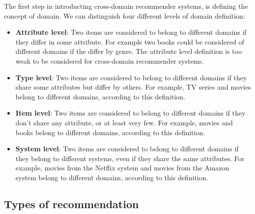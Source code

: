 The first step in introducting cross-domain recommender systems, is defining the concept of domain. We can distinguish four different levels of domain definition:
\begin{itemize}
\item \textbf{Attribute level}: Two items are considered to belong to different domains if they differ in some attribute. For example two books could be considered of different domains if the differ by genre. The attribute level definition is too weak to be considered for cross-domain recommender systems.
\item \textbf{Type level}: Two items are considered to belong to different domains if they share some attributes but differ by others. For example, TV series and movies belong to different domains, according to this definition.
\item \textbf{Item level}: Two items are considered to belong to different domains if they don't share any attribute, or at least very few. For example, movies and books belong to different domains, according to this definition.
\item \textbf{System level}: Two items are considered to belong to different domains if they belong to different systems, even if they share the same attributes. For example, movies from the Netflix system and movies from the Amazon system belong to different domains, according to this definition.
\end{itemize}


\subsection{Types of recommendation}

